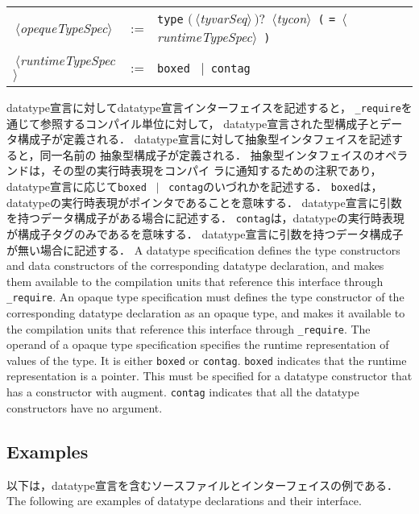 \documentclass{jbook}
\newcommand{\txt}[2]{#2}
\newcommand{\code}[1]{\mbox{\large\tt #1}}
\newcommand{\vbar}{\mbox{\ $|$\ }}
\newcommand{\nonterm}[1]{\mbox{$\,\langle$}{\it #1}\mbox{$\rangle\,$}}
\newcommand{\term}[1]{\mbox{{\tt #1}}}
\newcommand{\optional}[1]{\mbox{$($}{\protect #1}\mbox{$)?$}}
\begin{document}
\begin{center}
\begin{tabular}{lcll}
\nonterm{opequeTypeSpec}
  &:= & \term{type} \optional{\nonterm{tyvarSeq}} \nonterm{tycon} 
        \term{(} \term{=} \nonterm{runtimeTypeSpec} \term{)}\\
\nonterm{runtimeTypeSpec}
  &:= & \term{boxed} \vbar \term{contag}
\end{tabular}
\end{center}
\ifjp%
	datatype宣言に対してdatatype宣言インターフェイスを記述すると，
\code{\_require}を通じて参照するコンパイル単位に対して，
datatype宣言された型構成子とデータ構成子が定義される．
	datatype宣言に対して抽象型インタフェイスを記述すると，同一名前の
抽象型構成子が定義される．
	抽象型インタフェイスのオペランドは，その型の実行時表現をコンパイ
ラに通知するための注釈であり，datatype宣言に応じて\term{boxed} \vbar
\term{contag}のいづれかを記述する．
	\term{boxed}は，datatypeの実行時表現がポインタであることを意味する．
	datatype宣言に引数を持つデータ構成子がある場合に記述する．
	\term{contag}は，datatypeの実行時表現が構成子タグのみであるを意味する．
	datatype宣言に引数を持つデータ構成子が無い場合に記述する．
\else%
	A datatype specification defines the type constructors and data
constructors of the corresponding datatype declaration, and makes them
available to the compilation units that reference this interface through 
\code{\_require}.
	An opaque type specification must defines the type
constructor of the corresponding datatype declaration as an opaque type,
and makes it available to the compilation units that reference this
interface through  \code{\_require}.
	The operand of a opaque type specification specifies the runtime 
representation of values of the type. 
	It is either \term{boxed} or \term{contag}.
	\term{boxed} indicates that the runtime representation is a
pointer.
	This must be specified for a datatype constructor that has a
constructor with augment.
	\term{contag} indicates that all the datatype constructors have
no argument.
\fi%

\subsection{\txt{datatype宣言とインタフェイスの例}{Examples}}
\ifjp%
	以下は，datatype宣言を含むソースファイルとインターフェイスの例である．
\else%
	The following are examples of datatype declarations and their interface.
\fi%
\end{document}
